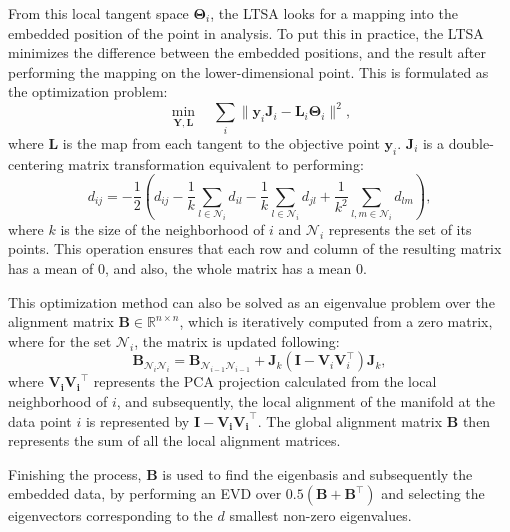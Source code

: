             From this local tangent space $\boldsymbol{\Theta}_i$, the \ac{LTSA} looks for a mapping into the embedded position of the point in analysis.
            To put this in practice, the \ac{LTSA} minimizes the difference between the embedded positions, and the result after performing the mapping on the lower-dimensional point. This is formulated as the optimization problem:
            \begin{equation}
                \min_{\boldsymbol{Y},\boldsymbol{L}} \quad \sum_i \| \boldsymbol{y}_i \boldsymbol{J}_i - \boldsymbol{L}_i \boldsymbol{\Theta}_i \|^2,
            \end{equation}
            where $\boldsymbol{L}$ is the map from each tangent to the objective point $\boldsymbol{y}_i$. $\boldsymbol{J}_i$ is a double-centering matrix transformation equivalent to performing:
            \begin{equation}
                d_{ij} = -\frac{1}{2} \left( d_{ij} - \frac{1}{k} \sum_{l \in \mathcal{N}_i} d_{il} - \frac{1}{k} \sum_{l \in \mathcal{N}_i} d_{jl} + \frac{1}{k^2}\sum_{l,m \in \mathcal{N}_i} d_{lm} \right),
                \label{double centre}
            \end{equation}
            where $k$ is the size of the neighborhood of $i$ and $\mathcal{N}_i$ represents the set of its points. This operation ensures that each row and column of the resulting matrix has a mean of $0$, and also, the whole matrix has a mean $0$.

            This optimization method can also be solved as an eigenvalue problem over the alignment matrix $\boldsymbol{B}\in\mathbb{R}^{n\times n}$, which is iteratively computed from a zero matrix, where for the set $\mathcal{N}_i$, the matrix is updated following:
            \begin{equation}
                \boldsymbol{B}_{\mathcal{N}_i\mathcal{N}_i} = \boldsymbol{B}_{\mathcal{N}_{i-1}\mathcal{N}_{i-1}} + \boldsymbol{J}_k(\boldsymbol{I} - \boldsymbol{V}_i\boldsymbol{V}_i^\top)\boldsymbol{J}_k,
            \end{equation}
            where $\boldsymbol{V_iV_i}^\top$ represents the \ac{PCA} projection calculated from the local neighborhood of $i$, and subsequently, the local alignment of the manifold at the data point $i$ is represented by $\boldsymbol{I - V_iV_i}^\top$. The global alignment matrix $\boldsymbol{B}$ then represents the sum of all the local alignment matrices.
            
            Finishing the process, $\boldsymbol{B}$ is used to find the eigenbasis and subsequently the embedded data, by performing an \ac{EVD} over $0.5(\boldsymbol{B} + \boldsymbol{B}^\top)$ and selecting the eigenvectors corresponding to the $d$ smallest non-zero eigenvalues. 

